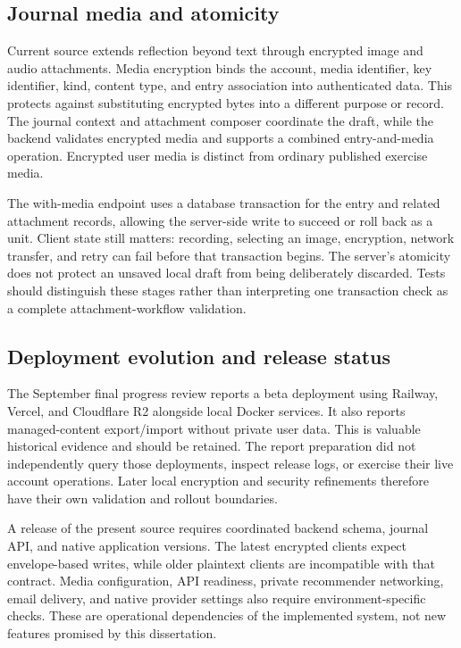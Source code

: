 \subsection{Journal media and atomicity}

Current source extends reflection beyond text through encrypted image and audio attachments. Media encryption binds the account, media identifier, key identifier, kind, content type, and entry association into authenticated data. This protects against substituting encrypted bytes into a different purpose or record. The journal context and attachment composer coordinate the draft, while the backend validates encrypted media and supports a combined entry-and-media operation. Encrypted user media is distinct from ordinary published exercise media.

The with-media endpoint uses a database transaction for the entry and related attachment records, allowing the server-side write to succeed or roll back as a unit. Client state still matters: recording, selecting an image, encryption, network transfer, and retry can fail before that transaction begins. The server's atomicity does not protect an unsaved local draft from being deliberately discarded. Tests should distinguish these stages rather than interpreting one transaction check as a complete attachment-workflow validation.

\subsection{Deployment evolution and release status}

The September final progress review reports a beta deployment using Railway, Vercel, and Cloudflare R2 alongside local Docker services. It also reports managed-content export/\allowbreak{}import without private user data. This is valuable historical evidence and should be retained. The report preparation did not independently query those deployments, inspect release logs, or exercise their live account operations. Later local encryption and security refinements therefore have their own validation and rollout boundaries.

A release of the present source requires coordinated backend schema, journal API, and native application versions. The latest encrypted clients expect envelope-based writes, while older plaintext clients are incompatible with that contract. Media configuration, API readiness, private recommender networking, email delivery, and native provider settings also require environment-specific checks. These are operational dependencies of the implemented system, not new features promised by this dissertation.

